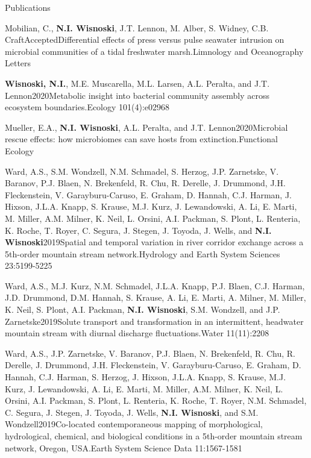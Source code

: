 \documentclass{resume} %
\begin{document}
\begin{rhangSection}{Publications}
\begin{Publication}{Mobilian, C., {\bf N.I. Wisnoski}, J.T. Lennon, M. Alber, S. Widney, C.B. Craft}{Accepted}{Differential effects of press versus pulse seawater intrusion on microbial communities of a tidal freshwater marsh.}{Limnology and Oceanography Letters}
\end{Publication}

\begin{Publication}{{\bf Wisnoski, N.I.}, M.E. Muscarella, M.L. Larsen, A.L. Peralta, and J.T. Lennon}{2020}{Metabolic insight into bacterial community assembly across ecosystem boundaries.}{Ecology 101(4):e02968}
\end{Publication}

\begin{Publication}{Mueller, E.A., {\bf N.I. Wisnoski}, A.L. Peralta, and J.T. Lennon}{2020}{Microbial rescue effects: how microbiomes can save hosts from extinction.}{Functional Ecology}
\end{Publication}

\begin{Publication}{Ward, A.S., S.M. Wondzell, N.M. Schmadel, S. Herzog, J.P. Zarnetske, V. Baranov, P.J. Blaen, N. Brekenfeld, R. Chu, R. Derelle, J. Drummond, J.H. Fleckenstein, V. Garayburu-Caruso, E. Graham, D. Hannah, C.J. Harman, J. Hixson, J.L.A. Knapp, S. Krause, M.J. Kurz, J. Lewandowski, A. Li, E. Marti, M. Miller, A.M. Milner, K. Neil, L. Orsini, A.I. Packman, S. Plont, L. Renteria, K. Roche, T. Royer, C. Segura, J. Stegen, J. Toyoda, J. Wells, and {\bf N.I. Wisnoski}}{2019}{Spatial and temporal variation in river corridor exchange across a 5th-order mountain stream network.}{Hydrology and Earth System Sciences 23:5199-5225} 
\end{Publication}

\begin{Publication}{Ward, A.S., M.J. Kurz, N.M. Schmadel, J.L.A. Knapp, P.J. Blaen, C.J. Harman, J.D. Drummond, D.M. Hannah, S. Krause, A. Li, E. Marti, A. Milner, M. Miller, K. Neil, S. Plont, A.I. Packman, {\bf N.I. Wisnoski}, S.M. Wondzell, and J.P. Zarnetske}{2019}{Solute transport and transformation in an intermittent, headwater mountain stream with diurnal discharge fluctuations.}{Water 11(11):2208}
\end{Publication}

\begin{Publication}{Ward, A.S., J.P. Zarnetske, V. Baranov, P.J. Blaen, N. Brekenfeld, R. Chu, R. Derelle, J. Drummond, J.H. Fleckenstein, V. Garayburu-Caruso, E. Graham, D. Hannah, C.J. Harman, S. Herzog, J. Hixson, J.L.A. Knapp, S. Krause, M.J. Kurz, J. Lewandowski, A. Li, E. Marti, M. Miller, A.M. Milner, K. Neil, L. Orsini, A.I. Packman, S. Plont, L. Renteria, K. Roche, T. Royer, N.M. Schmadel, C. Segura, J. Stegen, J. Toyoda, J. Wells, {\bf N.I. Wisnoski}, and S.M. Wondzell}{2019}{Co-located contemporaneous mapping of morphological, hydrological, chemical, and biological conditions in a 5th-order mountain stream network, Oregon, USA.}{Earth System Science Data 11:1567-1581}
\end{Publication}


\end{rhangSection}
\end{document}
